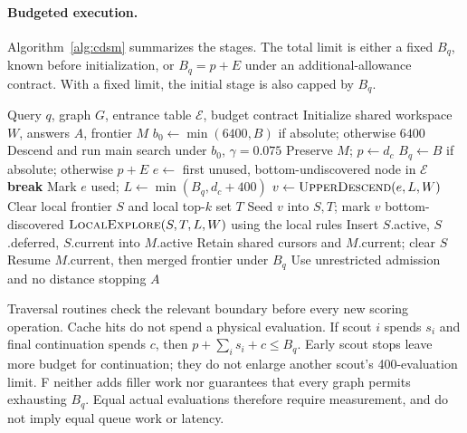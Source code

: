 \paragraph{Budgeted execution.}
Algorithm~\ref{alg:cdsm} summarizes the stages.
The total limit is either a fixed $B_q$, known before initialization,
or $B_q=p+E$ under an additional-allowance contract.
With a fixed limit, the initial stage is also capped by $B_q$.

\begin{algorithm}[t]
\small
\begin{algorithmic}[1]
\Require Query $q$, graph $G$, entrance table $\mathcal E$, budget contract
\State Initialize shared workspace $W$, answers $A$, frontier $M$
\State $b_0\gets\min(6400,B)$ if absolute; otherwise $6400$
\State Descend and run main search under $b_0$, $\gamma=0.075$
\State Preserve $M$; $p\gets d_c$ 
\State $B_q\gets B$ if absolute; otherwise $p+E$
  \State $e\gets$ first unused, bottom-undiscovered node in $\mathcal E$
   \State \textbf{break} \EndIf
  \State Mark $e$ used; $L\gets\min(B_q,d_c+400)$
  \State $v\gets\Call{UpperDescend}{e,L,W}$
  \State Clear local frontier $S$ and local top-$k$ set $T$
    \State Seed $v$ into $S,T$; mark $v$ bottom-discovered
    \State $\Call{LocalExplore}{S,T,L,W}$ using the local rules
  \EndIf
  \State Insert $S$.active, $S$.deferred, $S$.current into $M$.active
  \State Retain shared cursors and $M$.current; clear $S$
\EndFor
\State Resume $M$.current, then merged frontier under $B_q$
\State Use unrestricted admission and no distance stopping
\State \Return $A$
\end{algorithmic}
\caption{CDSM-F. Upper descent and local exploration check their limit before each new score. Final continuation stops at the limit or when recoverable work is exhausted.}
\label{alg:cdsm}
\end{algorithm}

Traversal routines check the relevant boundary before every new scoring
operation. Cache hits do not spend a physical evaluation.
If scout $i$ spends $s_i$ and final continuation spends $c$, then
$p+\sum_i s_i+c\leq B_q$.
Early scout stops leave more budget for continuation; they do not enlarge
another scout's 400-evaluation limit.
F neither adds filler work nor guarantees that every graph permits
exhausting $B_q$.
Equal actual evaluations therefore require measurement, and do not imply
equal queue work or latency.

